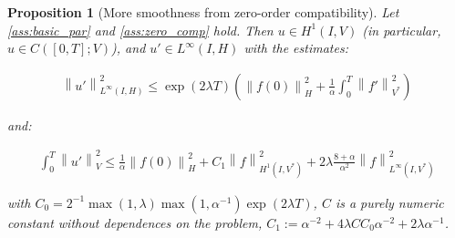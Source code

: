\documentclass[english,a4paper,12pt,oneside]{scrbook}
\theoremstyle{break}
\newtheorem{prop}[equation]{Proposition}
\theoremstyle{remark}
\newcommand{\ds}{\displaystyle}
\newcommand{\norm}[1]{\left\lVert#1\right\rVert}
\newcommand{\HN}[1]{\norm{#1}_{H}}
\newcommand{\VN}[1]{\norm{#1}_{V}}
\newcommand{\VSN}[1]{\norm{#1}_{V^*}}
\begin{document}
\begin{prop}[More smoothness from zero-order compatibility]
Let \cref{ass:basic_par} and \cref{ass:zero_comp} hold. Then $u \in H^1(I,V)$ (in particular, $u \in C([0,T];V)$), and  $u' \in L^\infty(I,H)$ with the estimates:

\begin{align*}
\norm{u'}^2_{L^\infty(I,H)} \leq \exp(2\lambda T) \left (  \HN{f(0)}^2 +\frac{1}{\alpha} \int_0^T \VSN{ f'}^2\right )
\end{align*}

and:

\begin{align*}
\int_0^T \VN{u'}^2 \leq  \frac{1}{\alpha } \HN{f(0)}^2 + C_1\norm{f}_{H^1(I,V^*)}^2  + 2\lambda\frac{8+\alpha}{\alpha^2}\norm{f}_{L^\infty(I,V^*)}^2
\end{align*}

with $C_0 = \ds 2^{-1}\max(1,\lambda)\max(1,\alpha^{-1})\exp(2\lambda T)$, $C$ is a purely numeric constant without dependences on the problem, $C_1:=\alpha^{-2} + 4 \lambda C C_0 \alpha^{-2} + 2\lambda\alpha ^{-1} $.


\end{prop}
\end{document}

